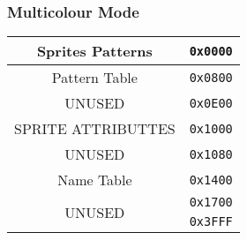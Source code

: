         \subsubsection{Multicolour Mode}
        \begin{center}
            \begin{tabular}{c r}
                \hline
                Sprites Patterns         & \texttt{0x0000}\\
                \hline
                Pattern Table           & \texttt{0x0800}\\
                \hline
                UNUSED                  & \texttt{0x0E00}\\
                \hline
                SPRITE ATTRIBUTTES      & \texttt{0x1000}\\
                \hline
                UNUSED                  & \texttt{0x1080}\\
                \hline
                Name Table              & \texttt{0x1400}\\
                \hline
                \multirow{2}{*}{UNUSED} & \texttt{0x1700}\\
                                        & \texttt{0x3FFF}\\
                \hline
            \end{tabular}
        \end{center}